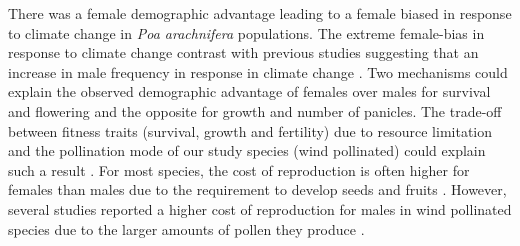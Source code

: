 \documentclass[12pt]{article}
\begin{document}
There was a female demographic advantage leading to a female biased in response to climate change in \emph{Poa arachnifera} populations.
The extreme female-bias in response to climate change contrast with  previous studies suggesting that an increase in male frequency in response in climate change \citep{petry2016sex,hultine2016climate}.
Two mechanisms could explain the observed demographic advantage of females over males for survival and flowering and the opposite for growth and number of panicles.
The trade-off between fitness traits (survival, growth and fertility) due to resource limitation and the pollination mode of our study species (wind pollinated) could explain such a result \citep{cipollini1994sexual,freeman1976differential}.
For most species, the cost of reproduction is often higher for females than males due to the requirement to develop seeds and fruits \citep{hultine2016climate}. 
However, several studies reported a higher cost of reproduction for males in wind pollinated species due to the larger amounts of pollen they produce \citep{burli2022environmental,cipollini1994sexual,bruijning2017surviving,field2013comparative}.
\end{document}
